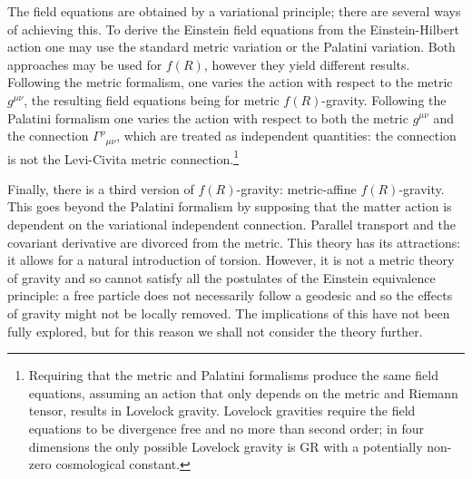 The field equations are obtained by a variational principle; there are several ways of achieving this. To derive the Einstein field equations from the Einstein-Hilbert action one may use the standard metric variation or the Palatini variation\cite{Misner1973}. Both approaches may be used for $f(R)$, however they yield different results\cite{Sotiriou2010, DeFelice2010}. Following the metric formalism, one varies the action with respect to the metric $g^{\mu\nu}$, the resulting field equations being for metric $f(R)$-gravity. Following the Palatini formalism one varies the action with respect to both the metric $g^{\mu\nu}$ and the connection ${\Gamma^\rho}_{\mu\nu}$, which are treated as independent quantities: the connection is not the Levi-Civita metric connection.\footnote{Requiring that the metric and Palatini formalisms produce the same field equations, assuming an action that only depends on the metric and Riemann tensor, results in Lovelock gravity\cite{Exirifard2008}. Lovelock gravities require the field equations to be divergence free and no more than second order; in four dimensions the only possible Lovelock gravity is GR with a potentially non-zero cosmological constant\cite{Lovelock1970, Lovelock1971, Lovelock1972}.}

Finally, there is a third version of $f(R)$-gravity: metric-affine $f(R)$-gravity\cite{Sotiriou2007, Sotiriou2007b}. This goes beyond the Palatini formalism by supposing that the matter action is dependent on the variational independent connection. Parallel transport and the covariant derivative are divorced from the metric. This theory has its attractions: it allows for a natural introduction of torsion. However, it is not a metric theory of gravity and so cannot satisfy all the postulates of the Einstein equivalence principle\cite{Will2006}: a free particle does not necessarily follow a geodesic and so the effects of gravity might not be locally removed\cite{Exirifard2008}. The implications of this have not been fully explored, but for this reason we shall not consider the theory further.

